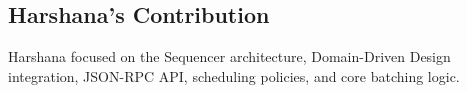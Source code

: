 \subsection{Harshana's Contribution}
\label{sec:harshana_contribution}
Harshana focused on the Sequencer architecture, Domain-Driven Design integration, JSON-RPC API, scheduling policies, and core batching logic.